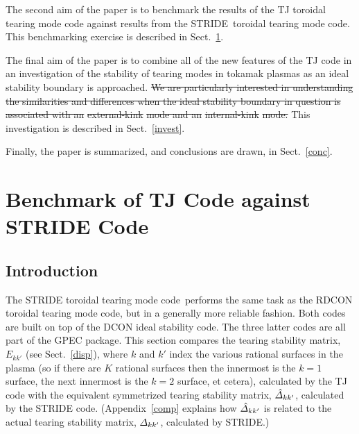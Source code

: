 \documentclass[12pt,prb,aps]{revtex4-1}
\providecommand{\DIFdel}[1]{{\protect\color{red}\sout{#1}}}                      %
\providecommand{\DIFdelbegin}{} %
\providecommand{\DIFdelend}{} %
\newcommand{\DIFscaledelfig}{0.5}
\newlength{\DIFdelgraphicswidth} %
\newlength{\DIFdelgraphicsheight} %
\newcommand{\DIFdelincludegraphics}[2][]{%
\sbox{\DIFdelgraphicsbox}{\DIFOincludegraphics[#1]{#2}}%
\settoboxwidth{\DIFdelgraphicswidth}{\DIFdelgraphicsbox} %
\settoboxtotalheight{\DIFdelgraphicsheight}{\DIFdelgraphicsbox} %
\scalebox{\DIFscaledelfig}{%
\parbox[b]{\DIFdelgraphicswidth}{\usebox{\DIFdelgraphicsbox}\\[-\baselineskip] \rule{\DIFdelgraphicswidth}{0em}}\llap{\resizebox{\DIFdelgraphicswidth}{\DIFdelgraphicsheight}{%
\setlength{\unitlength}{\DIFdelgraphicswidth}%
\begin{picture}(1,1)%
\thicklines\linethickness{2pt} %
{\color[rgb]{1,0,0}\put(0,0){\framebox(1,1){}}}%
{\color[rgb]{1,0,0}\put(0,0){\line( 1,1){1}}}%
{\color[rgb]{1,0,0}\put(0,1){\line(1,-1){1}}}%
\end{picture}%
}\hspace*{3pt}}} %
} %
\DeclareRobustCommand{\DIFdelbegin}{\DIFOdelbegin \let\includegraphics\DIFdelincludegraphics} %
\DeclareRobustCommand{\DIFdelend}{\DIFOaddend \let\includegraphics\DIFOincludegraphics} %
\begin{document}
The second aim of the paper is to benchmark the results of the TJ toroidal tearing mode code against results from the STRIDE\,\cite{aglas1} toroidal tearing mode code. This benchmarking
exercise is described in Sect.~\ref{benchmark}. 

The final aim of the paper is to combine all of the new features of the TJ code in an investigation of the stability of tearing modes in tokamak plasmas as
an ideal stability boundary is approached. \DIFdelbegin \DIFdel{We are particularly interested in understanding the similarities and differences when the ideal stability boundary in question is associated with
an }%
\DIFdel{external-kink}%
\DIFdel{\/ mode and an }%
\DIFdel{internal-kink}%
\DIFdel{\/ mode. }\DIFdelend This investigation is described in Sect.~\ref{invest}.

Finally, the paper is summarized, and conclusions are drawn, in Sect.~\ref{conc}. 

\section{Benchmark of TJ Code against STRIDE Code}\label{benchmark}
\subsection{Introduction}
The STRIDE toroidal tearing mode code\,\cite{aglas1} performs the same task as the RDCON toroidal tearing mode code,\cite{aglas2} but in a generally more reliable fashion. Both codes are built on top of the
DCON ideal stability code.\cite{dcon} The three latter codes are all  part of the GPEC package.\cite{gpec} This section compares the tearing stability matrix, $E_{kk'}$ (see Sect.~\ref{disp}), where $k$ and $k'$ index the various rational surfaces in the
plasma (so if there are $K$ rational surfaces then the innermost is the $k=1$ surface, the next innermost is the $k=2$ surface, et cetera), calculated by the TJ code with the equivalent symmetrized tearing stability matrix, $\hat{\mit\Delta}_{kk'}$, calculated by the STRIDE code. (Appendix~\ref{comp} explains how
$\hat{\mit\Delta}_{kk'}$ is related to the actual tearing stability matrix, ${\mit\Delta}_{kk'}$, calculated by STRIDE.)
\end{document}
